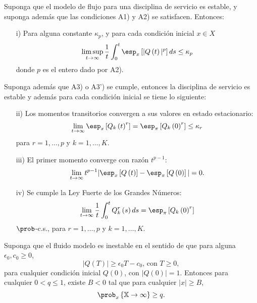 \begin{Teo}\label{Tma2.1}
Suponga que el modelo de flujo para una disciplina de servicio es
estable, y suponga adem\'as que las condiciones A1) y A2) se
satisfacen. Entonces:
\begin{itemize}
\item[i)] Para alguna constante $\kappa_{p}$, y para cada
condici\'on inicial $x\in X$
\begin{equation}
\limsup_{t\rightarrow\infty}\frac{1}{t}\int_{0}^{t}\esp_{x}\left[|Q\left(t\right)|^{p}\right]ds\leq\kappa_{p}
\end{equation}
donde $p$ es el entero dado por A2).
\end{itemize}

Suponga adem\'as que A3) o A3')
se cumple, entonces la disciplina de servicio es estable y adem\'as
para cada condici\'on inicial se tiene lo siguiente:
\begin{itemize}

\item[ii)] Los momentos transitorios convergen a sus valores en estado
estacionario:
\begin{equation}
\lim_{t\rightarrow\infty}\esp_{x}\left[Q_{k}\left(t\right)^{r}\right]=\esp_{\pi}\left[Q_{k}\left(0\right)^{r}\right]\leq\kappa_{r}
\end{equation}
para $r=1,\ldots,p$ y $k=1,\ldots,K$. \item[iii)] El primer
momento converge con raz\'on $t^{p-1}$:
\begin{equation}
\lim_{t\rightarrow\infty}t^{p-1}|\esp_{x}\left[Q\left(t\right)\right]-\esp_{\pi}\left[Q\left(0\right)\right]|=0.
\end{equation}
\item[iv)] Se cumple la Ley Fuerte de los Grandes N\'umeros:
\begin{equation}
\lim_{t\rightarrow\infty}\frac{1}{t}\int_{0}^{t}Q_{k}^{r}\left(s\right)ds=\esp_{\pi}\left[Q_{k}\left(0\right)^{r}\right]
\end{equation}
$\prob$-c.s., para $r=1,\ldots,p$ y $k=1,\ldots,K$.
\end{itemize}
\end{Teo}


\begin{Teo}\label{Tma2.2}
Suponga que el fluido modelo es inestable en el sentido de que
para alguna $\epsilon_{0},c_{0}\geq0$,
\begin{equation}\label{Eq.Inestability}
|Q\left(T\right)|\geq\epsilon_{0}T-c_{0}\textrm{, con }T\geq0,
\end{equation}
para cualquier condici\'on inicial $Q\left(0\right)$, con
$|Q\left(0\right)|=1$. Entonces para cualquier $0<q\leq1$, existe
$B<0$ tal que para cualquier $|x|\geq B$,
\begin{equation}
\prob_{x}\left\{\mathbb{X}\rightarrow\infty\right\}\geq q.
\end{equation}
\end{Teo}

